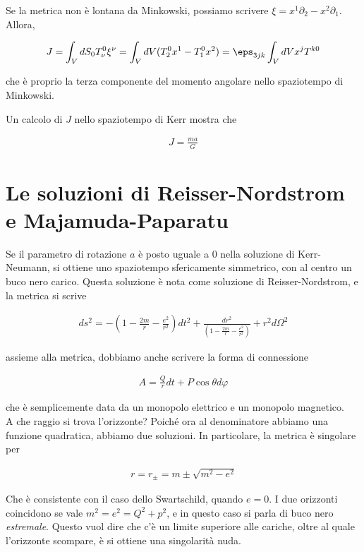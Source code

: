 \documentclass{report}
\begin{document}
    Se la metrica non è lontana da Minkowski, possiamo scrivere \(\xi = x^1\partial_2 - x^2\partial_1\). Allora, 

    \begin{align}
        J = \int_V dS_0 T^0_\nu \xi^\nu = \int_V dV (T^0_2 x^1 - T^0_1 x^2) = \eps_{3jk}\int_V dV x^jT^{k0}
    \end{align}

    che è proprio la terza componente del momento angolare nello spaziotempo di Minkowski. 

    Un calcolo di \(J\) nello spaziotempo di Kerr mostra che 

    \begin{align}
        J = \frac{ma}{G}
    \end{align}


\section{Le soluzioni di Reisser-Nordstrom e Majamuda-Paparatu}

Se il parametro di rotazione \(a\) è posto uguale a 0 nella soluzione di Kerr-Neumann, si ottiene uno spaziotempo sfericamente simmetrico, con al centro un buco nero carico. Questa soluzione è nota come soluzione di Reisser-Nordstrom, e la metrica si scrive 

\begin{align}
    ds^2 = -\left(1-\frac{2m}{r}- \frac{e^2}{r^2}\right)dt^2 + \frac{dr^2}{\left(1-\frac{2m}{r}- \frac{e^2}{r^2}\right)} + r^2d\Omega^2
\end{align}

assieme alla metrica, dobbiamo anche scrivere la forma di connessione

\begin{align}
    A = \frac{Q}{r}dt + P\cos\theta d\varphi
\end{align}

che è semplicemente data da un monopolo elettrico e un monopolo magnetico. \\

A che raggio si trova l'orizzonte? Poiché ora al denominatore abbiamo una funzione quadratica, abbiamo due soluzioni. In particolare, la metrica è singolare per 

\begin{align}
    r = r_{\pm} = m \pm \sqrt{m^2-e^2}
\end{align}

Che è consistente con il caso dello Swartschild, quando \(e=0\). I due orizzonti coincidono se vale \(m^2 = e^2 = Q^2 +p^2\), e in questo caso si parla di buco nero \emph{estremale}. Questo vuol dire che c'è un limite superiore alle cariche, oltre al quale l'orizzonte scompare, è si ottiene una singolarità nuda. \\
\end{document}

